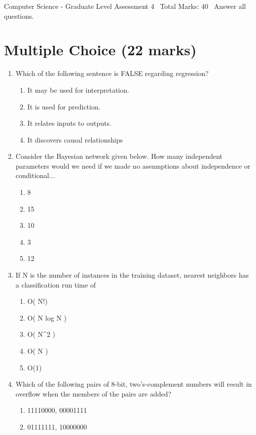 \documentclass[12pt]{article}
\begin{document}
\begin{center}
Computer Science - Graduate Level Assessment 4 \
Total Marks: 40 \
Answer all questions.
\end{center}

\section*{Multiple Choice (22 marks)}
\begin{enumerate}[label=\arabic*.]
\item Which of the following sentence is FALSE regarding regression?
\begin{enumerate}[label=(\alph*)]
    \item It may be used for interpretation.
    \item It is used for prediction.
    \item It relates inputs to outputs.
    \item It discovers causal relationships
\end{enumerate}
\item Consider the Bayesian network given below. How many independent parameters would we need if we made no assumptions about independence or conditional...
\begin{enumerate}[label=(\alph*)]
    \item 8
    \item 15
    \item 10
    \item 3
    \item 12
\end{enumerate}
\item If N is the number of instances in the training dataset, nearest neighbors has a classification run time of
\begin{enumerate}[label=(\alph*)]
    \item O( N!)
    \item O( N log N )
    \item O( N\^{}2 )
    \item O( N )
    \item O(1)
\end{enumerate}
\item Which of the following pairs of 8-bit, two's-complement numbers will result in overflow when the members of the pairs are added?
\begin{enumerate}[label=(\alph*)]
    \item 11110000, 00001111
    \item 01111111, 10000000

\end{enumerate}
\end{enumerate}
\end{document}
